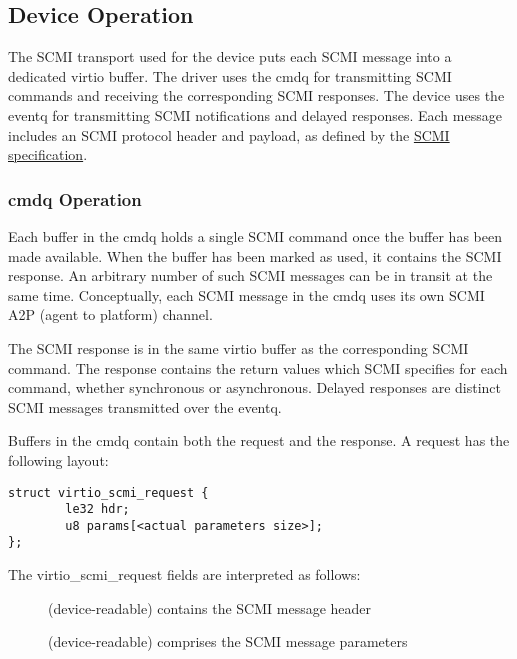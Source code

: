 \subsection{Device Operation}\label{sec:Device Types / SCMI Device / Device Operation}

The SCMI transport used for the device puts each SCMI message into a
dedicated virtio buffer. The driver uses the cmdq for transmitting SCMI
commands and receiving the corresponding SCMI responses. The device uses
the eventq for transmitting SCMI notifications and delayed responses.
Each message includes an SCMI protocol header and payload, as defined by
the \hyperref[intro:SCMI]{SCMI specification}.

\subsubsection{cmdq Operation}\label{sec:Device Types / SCMI Device / Device Operation / cmdq Operation}

Each buffer in the cmdq holds a single SCMI command once the buffer has
been made available. When the buffer has been marked as used, it
contains the SCMI response. An arbitrary number of such SCMI messages
can be in transit at the same time. Conceptually, each SCMI message in
the cmdq uses its own SCMI A2P (agent to platform) channel.

The SCMI response is in the same virtio buffer as the corresponding SCMI
command. The response contains the return values which SCMI specifies
for each command, whether synchronous or asynchronous. Delayed responses
are distinct SCMI messages transmitted over the eventq.

Buffers in the cmdq contain both the request and the response. A request
has the following layout:

\begin{lstlisting}
struct virtio_scmi_request {
        le32 hdr;
        u8 params[<actual parameters size>];
};
\end{lstlisting}

The virtio_scmi_request fields are interpreted as follows:

\begin{description}
\item[] (device-readable) contains the SCMI message header
\item[] (device-readable) comprises the SCMI message
parameters
\end{description}

